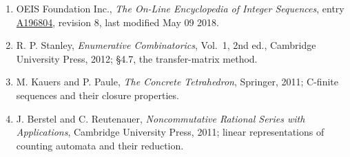 \documentclass[11pt]{article}
\theoremstyle{definition}
\begin{document}
\begin{enumerate}

\item OEIS Foundation Inc., \emph{The On-Line Encyclopedia of Integer Sequences}, entry \href{https://oeis.org/A196804}{A196804}, revision 8, last modified May 09 2018.

\item R. P. Stanley, \emph{Enumerative Combinatorics}, Vol.~1, 2nd ed., Cambridge University Press, 2012; \S4.7, the transfer-matrix method.

\item M. Kauers and P. Paule, \emph{The Concrete Tetrahedron}, Springer, 2011; C-finite sequences and their closure properties.

\item J. Berstel and C. Reutenauer, \emph{Noncommutative Rational Series with Applications}, Cambridge University Press, 2011; linear representations of counting automata and their reduction.

\end{enumerate}
\end{document}

